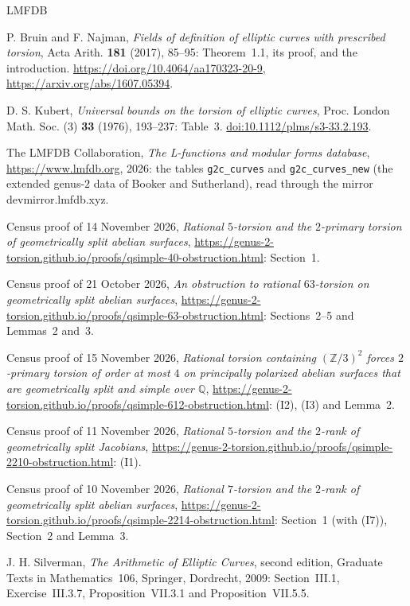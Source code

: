 \documentclass[11pt]{article}
\newcommand{\Q}{\mathbb Q}
\newcommand{\Z}{\mathbb Z}
\begin{document}
\begin{thebibliography}{LMFDB}

P. Bruin and F. Najman, \emph{Fields of definition of elliptic curves with prescribed torsion}, Acta Arith.
\textbf{181} (2017), 85--95: Theorem~1.1, its proof, and the introduction.
\url{https://doi.org/10.4064/aa170323-20-9}, \url{https://arxiv.org/abs/1607.05394}.

D. S. Kubert, \emph{Universal bounds on the torsion of elliptic curves}, Proc. London Math. Soc. (3)
\textbf{33} (1976), 193--237: Table~3.
\href{https://doi.org/10.1112/plms/s3-33.2.193}{doi:10.1112/plms/s3-33.2.193}.

The LMFDB Collaboration, \emph{The L-functions and modular forms database}, \url{https://www.lmfdb.org}, 2026: the
tables \texttt{g2c\_curves} and \texttt{g2c\_curves\_new} (the extended genus-\(2\) data of Booker and
Sutherland), read through the mirror devmirror.lmfdb.xyz.

Census proof of 14 November 2026, \emph{Rational \(5\)-torsion and the \(2\)-primary torsion of geometrically split
abelian surfaces}, \url{https://genus-2-torsion.github.io/proofs/qsimple-40-obstruction.html}: Section~1.

Census proof of 21 October 2026, \emph{An obstruction to rational \(63\)-torsion on geometrically split abelian
surfaces}, \url{https://genus-2-torsion.github.io/proofs/qsimple-63-obstruction.html}: Sections~2--5 and
Lemmas~2 and~3.

Census proof of 15 November 2026, \emph{Rational torsion containing \((\Z/3)^2\) forces \(2\)-primary torsion of
order at most \(4\) on principally polarized abelian surfaces that are geometrically split and simple over
\(\Q\)}, \url{https://genus-2-torsion.github.io/proofs/qsimple-612-obstruction.html}: (I2), (I3) and Lemma~2.

Census proof of 11 November 2026, \emph{Rational \(5\)-torsion and the \(2\)-rank of geometrically split
Jacobians}, \url{https://genus-2-torsion.github.io/proofs/qsimple-2210-obstruction.html}: (I1).

Census proof of 10 November 2026, \emph{Rational \(7\)-torsion and the \(2\)-rank of geometrically split abelian
surfaces}, \url{https://genus-2-torsion.github.io/proofs/qsimple-2214-obstruction.html}: Section~1 (with (I7)),
Section~2 and Lemma~3.

J. H. Silverman, \emph{The Arithmetic of Elliptic Curves}, second edition, Graduate Texts in Mathematics~106,
Springer, Dordrecht, 2009: Section~III.1, Exercise~III.3.7, Proposition~VII.3.1 and Proposition~VII.5.5.


\end{thebibliography}
\end{document}
